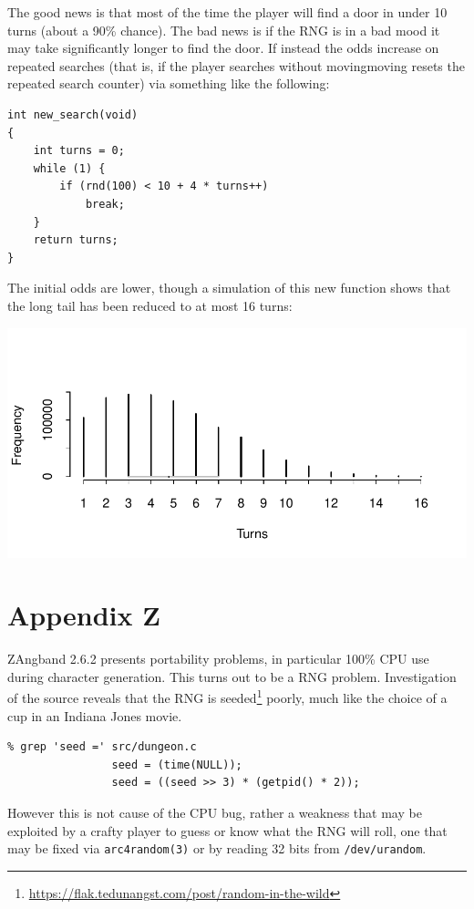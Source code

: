 \documentclass[12pt,a4paper]{article}
\begin{document}
The good news is that most of the time the player will find a door in
under 10 turns (about a 90\% chance). The bad news is if the RNG is in a
bad mood it may take significantly longer to find the door. If instead
the odds increase on repeated searches (that is, if the player searches
without moving\textendash moving resets the repeated search counter) via
something like the following:

\begin{verbatim}
int new_search(void)
{
    int turns = 0;
    while (1) {
        if (rnd(100) < 10 + 4 * turns++)
            break;
    }
    return turns;
}
\end{verbatim}

The initial odds are lower, though a simulation of this new
function shows that the long tail has been reduced to at most
16 turns:

\includegraphics{new-door-find-frequency.pdf}%

\section*{Appendix Z}

ZAngband 2.6.2 presents portability problems, in particular 100\% CPU
use during character generation. This turns out to be a RNG problem.
Investigation of the source reveals that the RNG is
seeded\footnote{\url{https://flak.tedunangst.com/post/random-in-the-wild}}
poorly, much like the choice of a cup in an Indiana Jones movie.

\begin{verbatim}
% grep 'seed =' src/dungeon.c 
                seed = (time(NULL));
                seed = ((seed >> 3) * (getpid() * 2));
\end{verbatim}

However this is not cause of the CPU bug, rather a weakness that may be
exploited by a crafty player to guess or know what the RNG will roll,
one that may be fixed via \texttt{arc4random(3)} or by reading 32 bits
from \texttt{/dev/urandom}. \\
\end{document}
